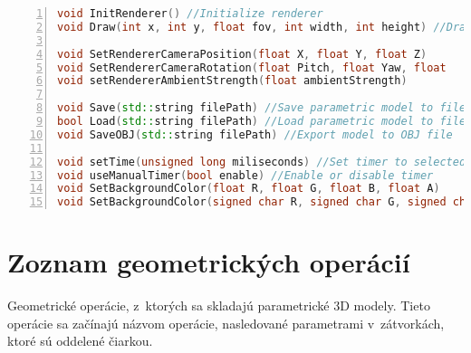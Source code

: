 \begin{lstlisting}[numbers=left,language=c++]
void InitRenderer() //Initialize renderer
void Draw(int x, int y, float fov, int width, int height) //Draw  with OpenGL

void SetRendererCameraPosition(float X, float Y, float Z)
void SetRendererCameraRotation(float Pitch, float Yaw, float 
void setRendererAmbientStrength(float ambientStrength)

void Save(std::string filePath) //Save parametric model to file
bool Load(std::string filePath) //Load parametric model to file
void SaveOBJ(std::string filePath) //Export model to OBJ file

void setTime(unsigned long miliseconds) //Set timer to selected time
void useManualTimer(bool enable) //Enable or disable timer
void SetBackgroundColor(float R, float G, float B, float A) 
void SetBackgroundColor(signed char R, signed char G, signed char B, signed char A)
\end{lstlisting}

\chapter{Zoznam geometrických operácií}
\label{Priloha:zoznamGeometrickychOperacii}
Geometrické operácie, z~ktorých sa skladajú parametrické 3D modely. Tieto operácie sa začínajú názvom operácie, nasledované parametrami v~zátvorkách, ktoré sú oddelené čiarkou.

